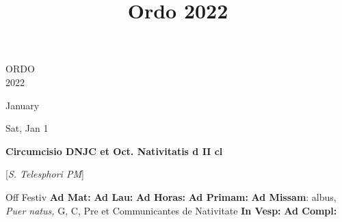 \documentclass[10pt]{memoir}
\title{Ordo 2022}
\begin{document}
    \pagestyle{fancy}
    
    \thispagestyle{empty}
    \begin{center}
        \begin{minipage}[c][3in][c]{3.5in}
            \begin{center}
                {\HUGE \lsstyle ORDO}\\
                \vspace{0.2in}
                {\lsstyle \LARGE 2022}
            \end{center}
        \end{minipage}
    \end{center}
    \clearpage
    \pagebreak
    

\begin{center}
\pagebreak
\thispagestyle{empty}
{\Huge January}
\end{center}
                    
\begin{center}
\begin{minipage}{3.5in}
\vspace{2em}
\begin{center}Sat, Jan 1
\end{center}
\textbf{ \large Circumcisio DNJC et Oct. Nativitatis
\textnormal{\normalsize d II cl}}

[\textit{S. Telesphori PM}]

\begin{justify}Off Festiv
\textbf{Ad Mat: }
\textbf{Ad Lau: }
\textbf{Ad Horas: }
\textbf{Ad Primam: }\textbf{Ad Missam}: albus, \textit{Puer natus,} G, C, Pre et Communicantes de Nativitate
\textbf{In Vesp: }
\textbf{Ad Compl: }
\end{justify}
\end{minipage}
\end{center}
\end{document}
